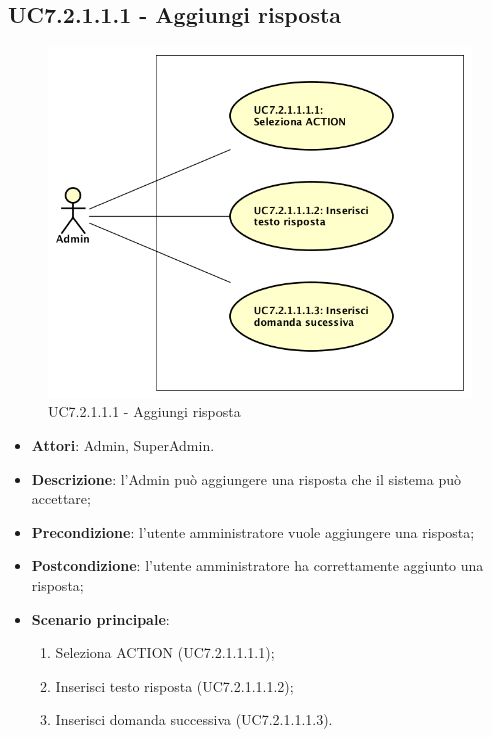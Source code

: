 \documentclass[../AnalisiDeiRequisiti_v4.0.0.tex]{subfiles}
\begin{document}
\begin{itemize}
\subsection{UC7.2.1.1.1 - Aggiungi risposta} 
\label{sssec:UC7.2.1.1.1} 
\begin{figure}[!h]
	\centering
	\includegraphics[scale=0.7]{UseCases/UC7_GestionePannelloAdmin/UC7_2_GestioneDomande/UC7_2_1_AggiungiDomanda/UC7_2_1_1_GestioneRisposte/UC7_2_1_1_1_AggiungiRisposta/UC7_2_1_1_1_AggiungiRisposta.png}
	\caption{UC7.2.1.1.1 - Aggiungi risposta}
\end{figure}
\begin{itemize} 
\item \textbf{Attori}: Admin, SuperAdmin.
\item \textbf{Descrizione}: l'Admin può aggiungere una risposta che il sistema può accettare;
\item \textbf{Precondizione}: l'utente amministratore vuole aggiungere una risposta;
\item \textbf{Postcondizione}: l'utente amministratore ha correttamente aggiunto una risposta;
\item \textbf{Scenario principale}: \begin{enumerate}\item Seleziona ACTION (UC7.2.1.1.1.1);\item Inserisci testo risposta (UC7.2.1.1.1.2);\item Inserisci domanda successiva (UC7.2.1.1.1.3).
\end{enumerate}
\end{itemize}  

\end{itemize}
\end{document}
